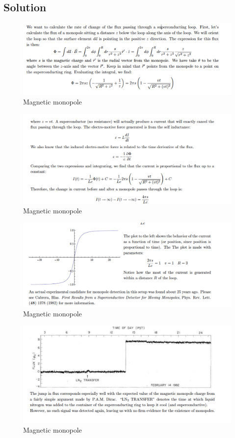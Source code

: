 \documentclass[solutions]{esg8022pset}
\begin{document}
\subsection{Solution}

 \begin{figure}[H]
    \centering
    \includegraphics[width = 15cm]{mono_sol_a}
    \caption{Magnetic monopole}
\end{figure}

 \begin{figure}[H]
    \centering
    \includegraphics[width = 15cm]{mono_sol_b}
    \caption{Magnetic monopole}
\end{figure}

 \begin{figure}[H]
    \centering
    \includegraphics[width = 15cm]{monopole_sol_c}
    \caption{Magnetic monopole}
   \end{figure}

     \begin{figure}[H]
    \centering
    \includegraphics[width = 15cm]{monopole_sol_d}
    \caption{Magnetic monopole}
\end{figure}
\end{document}
